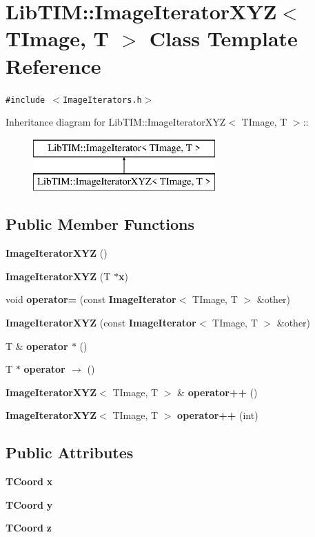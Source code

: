 \section{Lib\-TIM::Image\-Iterator\-XYZ$<$ TImage, T $>$ Class Template Reference}
\label{classLibTIM_1_1ImageIteratorXYZ}
{\tt \#include $<$Image\-Iterators.h$>$}

Inheritance diagram for Lib\-TIM::Image\-Iterator\-XYZ$<$ TImage, T $>$::\begin{figure}[H]
\begin{center}
\leavevmode
\includegraphics[height=2cm]{classLibTIM_1_1ImageIteratorXYZ}
\end{center}
\end{figure}
\subsection*{Public Member Functions}
\begin{CompactItemize}
\item 
{\bf Image\-Iterator\-XYZ} ()
\item 
{\bf Image\-Iterator\-XYZ} (T $\ast${\bf x})
\item 
void {\bf operator=} (const {\bf Image\-Iterator}$<$ TImage, T $>$ \&other)
\item 
{\bf Image\-Iterator\-XYZ} (const {\bf Image\-Iterator}$<$ TImage, T $>$ \&other)
\item 
T \& {\bf operator $\ast$} ()
\item 
T $\ast$ {\bf operator $\rightarrow$ } ()
\item 
{\bf Image\-Iterator\-XYZ}$<$ TImage, T $>$ \& {\bf operator++} ()
\item 
{\bf Image\-Iterator\-XYZ}$<$ TImage, T $>$ {\bf operator++} (int)
\end{CompactItemize}
\subsection*{Public Attributes}
\begin{CompactItemize}
\item 
{\bf TCoord} {\bf x}
\item 
{\bf TCoord} {\bf y}
\item 
{\bf TCoord} {\bf z}
\end{CompactItemize}
